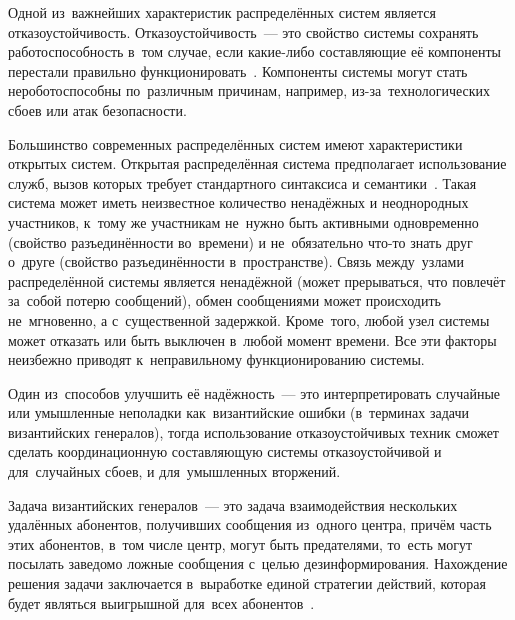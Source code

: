 Одной из~важнейших характеристик распределённых систем является отказоустойчивость. Отказоустойчивость~--- это свойство системы сохранять работоспособность в~том случае, если какие-либо составляющие её компоненты перестали правильно функционировать~\autocite{Tanenbaum}. Компоненты системы могут стать нероботоспособны по~различным причинам, например, из-за~технологических сбоев или атак безопасности.

Большинство современных распределённых систем имеют характеристики открытых систем. Открытая распределённая система предполагает использование служб, вызов которых требует стандартного синтаксиса и семантики~\autocite{Kosyakov}. Такая система может иметь неизвестное количество ненадёжных и неоднородных участников, к~тому же участникам не~нужно быть активными одновременно (свойство разъединённости во~времени) и не~обязательно что-то знать друг о~друге (свойство разъединённости в~пространстве). Связь между~узлами распределённой системы является ненадёжной (может прерываться, что повлечёт за~собой потерю сообщений), обмен сообщениями может происходить не~мгновенно, а с~существенной задержкой. Кроме~того, любой узел системы может отказать или быть выключен в~любой момент времени. Все эти факторы неизбежно приводят к~неправильному функционированию системы.

Один из~способов улучшить её надёжность~--- это интерпретировать случайные или умышленные неполадки как~византийские ошибки (в~терминах задачи византийских генералов), тогда использование отказоустойчивых техник сможет сделать координационную составляющую системы отказоустойчивой и для~случайных сбоев, и для~умышленных вторжений.

Задача византийских генералов~--- это задача взаимодействия нескольких удалённых абонентов, получивших сообщения из~одного центра, причём часть этих абонентов, в~том числе центр, могут быть предателями, то~есть могут посылать заведомо ложные сообщения с~целью дезинформирования. Нахождение решения задачи заключается в~выработке единой стратегии действий, которая будет являться выигрышной для~всех абонентов~\autocite{byzgen}.

